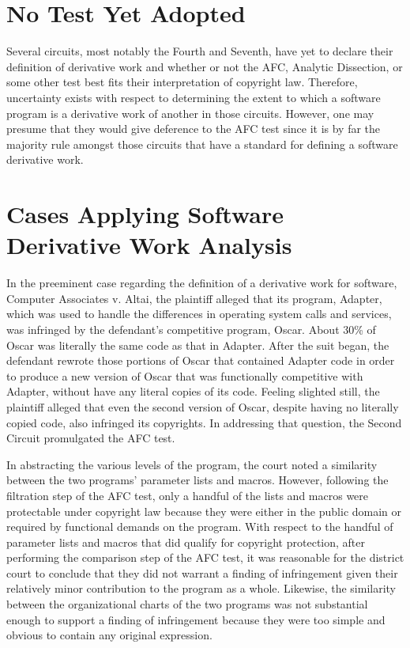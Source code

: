 \section{No Test Yet Adopted}

Several circuits, most notably the Fourth and Seventh, have yet to
declare their definition of derivative work and whether or not the
AFC, Analytic Dissection, or some other test best fits their
interpretation of copyright law. Therefore, uncertainty exists with
respect to determining the extent to which a software program is a
derivative work of another in those circuits. However, one may presume
that they would give deference to the AFC test since it is by far the
majority rule amongst those circuits that have a standard for defining
a software derivative work.

\section{Cases Applying Software Derivative Work Analysis}

In the preeminent case regarding the definition of a derivative work for
software, Computer Associates v. Altai, the plaintiff alleged that its
program, Adapter, which was used to handle the differences in operating
system calls and services, was infringed by the defendant's competitive
program, Oscar. About 30\% of Oscar was literally the same code as
that in Adapter. After the suit began, the defendant rewrote those
portions of Oscar that contained Adapter code in order to produce a new
version of Oscar that was functionally competitive with Adapter, without
have any literal copies of its code. Feeling slighted still, the
plaintiff alleged that even the second version of Oscar, despite having no
literally copied code, also infringed its copyrights. In addressing that
question, the Second Circuit promulgated the AFC test.

In abstracting the various levels of the program, the court noted a
similarity between the two programs' parameter lists and macros. However,
following the filtration step of the AFC test, only a handful of the lists
and macros were protectable under copyright law because they were either
in the public domain or required by functional demands on the
program. With respect to the handful of parameter lists and macros that
did qualify for copyright protection, after performing the comparison step
of the AFC test, it was reasonable for the district court to conclude that
they did not warrant a finding of infringement given their relatively minor
contribution to the program as a whole. Likewise, the similarity between
the organizational charts of the two programs was not substantial enough
to support a finding of infringement because they were too simple and
obvious to contain any original expression.


